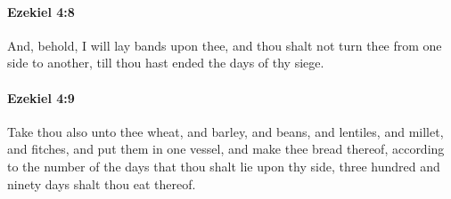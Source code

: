 		\paragraph{Ezekiel 4:8} %
			\label{EZEKIEL-4-8}

			And, behold, I will lay bands upon thee, and thou shalt not turn thee from one side to another, till thou hast ended the days of thy siege.


		\paragraph{Ezekiel 4:9} %
			\label{EZEKIEL-4-9}

			Take thou also unto thee wheat, and barley, and beans, and lentiles, and millet, and fitches, and put them in one vessel, and make thee bread thereof, according to the number of the days that thou shalt lie upon thy side, three hundred and ninety days shalt thou eat thereof.

